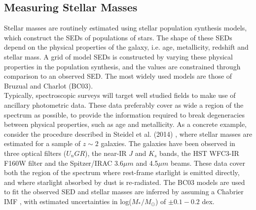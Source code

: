 \documentclass{literature}
\begin{document}
\subsection{Measuring Stellar Masses}
Stellar masses are routinely estimated using stellar population synthesis models, which construct the SEDs of populations of stars. The shape of these SEDs depend on the physical properties of the galaxy, i.e. age, metallicity, redshift and stellar mass. A grid of model SEDs is constructed by varying these physical properties in the population synthesis, and the values are constrained through comparison to an observed SED. The most widely used models are those of Bruzual and Charlot \citep{Bruzual2003} (BC03). \\      
Typically, spectroscopic surveys will target well studied fields to make use of ancillary photometric data. These data preferably cover as wide a region of the spectrum as possible, to provide the information required to break degeneracies between physical properties, such as age and metallicity. As a concrete example, consider the procedure described in Steidel et al. (2014) \citep{Steidel2014}, where stellar masses are estimated for a sample of $z \sim 2$ galaxies. The galaxies have been observed in three optical filters (\textit{$U_{n}GR$}), the near-IR  $ J $ and $ K_{s}$ bands, the HST WFC3-IR F160W filter and the Spitzer/IRAC 3.6$\mu m$ and 4.5$\mu m$ beams. These data cover both the region of the spectrum where rest-frame starlight is emitted directly, and where starlight absorbed by dust is re-radiated. The BC03 models are used to fit the observed SED and stellar masses are inferred by assuming a Chabrier IMF \citep{Chabrier2003}, with estimated uncertainties in log($M_{*} /M_{\odot}$) of $\pm 0.1-0.2 $ dex.    
\end{document}
